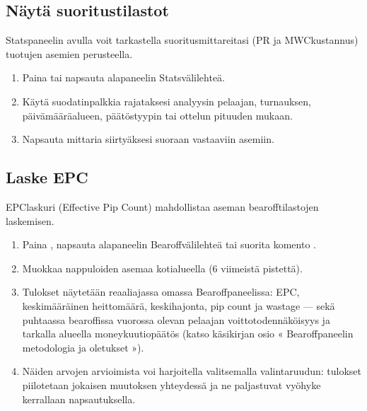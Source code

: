 \documentclass[letterpaper,10pt,finnish]{sphinxmanual}
\begin{document}
\subsection{Näytä suoritustilastot}
\label{\detokenize{guide_utilisateur:afficher-les-statistiques-de-performance}}
\sphinxAtStartPar
Stats\sphinxhyphen{}paneelin avulla voit tarkastella suoritusmittareitasi (PR ja MWC\sphinxhyphen{}kustannus) tuotujen asemien perusteella.
\begin{enumerate}
%
\item {} 
\sphinxAtStartPar
Paina  tai napsauta alapaneelin Stats\sphinxhyphen{}välilehteä.

\item {} 
\sphinxAtStartPar
Käytä suodatinpalkkia rajataksesi analyysin pelaajan, turnauksen, päivämääräalueen, päätöstyypin tai ottelun pituuden mukaan.

\item {} 
\sphinxAtStartPar
Napsauta mittaria siirtyäksesi suoraan vastaaviin asemiin.

\end{enumerate}


\subsection{Laske EPC}
\label{\detokenize{guide_utilisateur:calculer-l-epc}}
\sphinxAtStartPar
EPC\sphinxhyphen{}laskuri (Effective Pip Count) mahdollistaa aseman bearoff\sphinxhyphen{}tilastojen laskemisen.
\begin{enumerate}
%
\item {} 
\sphinxAtStartPar
Paina , napsauta alapaneelin Bearoff\sphinxhyphen{}välilehteä tai suorita komento .

\item {} 
\sphinxAtStartPar
Muokkaa nappuloiden asemaa kotialueella (6 viimeistä pistettä).

\item {} 
\sphinxAtStartPar
Tulokset näytetään reaaliajassa omassa Bearoff\sphinxhyphen{}paneelissa: EPC, keskimääräinen heittomäärä, keskihajonta, pip count ja wastage — sekä puhtaassa bearoffissa vuorossa olevan pelaajan voittotodennäköisyys ja tarkalla alueella money\sphinxhyphen{}kuutiopäätös (katso käsikirjan osio « Bearoff\sphinxhyphen{}paneelin metodologia ja oletukset »).

\item {} 
\sphinxAtStartPar
Näiden arvojen arvioimista voi harjoitella valitsemalla \sphinxhyphen{}valintaruudun: tulokset piilotetaan jokaisen muutoksen yhteydessä ja ne paljastuvat vyöhyke kerrallaan napsautuksella.

\end{enumerate}
\end{document}
